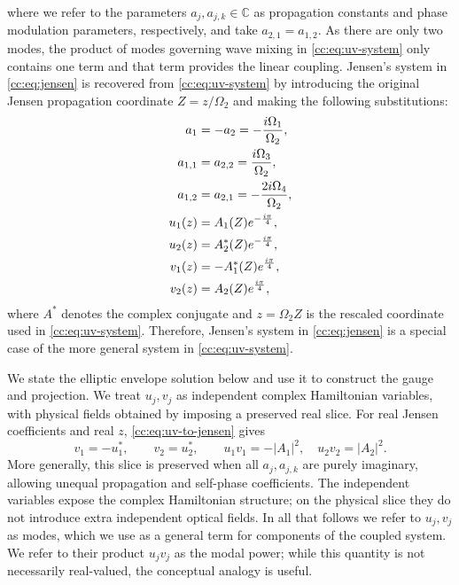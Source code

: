 \documentclass[11pt,a4paper]{article}
\numberwithin{equation}{section}
\begin{document}
where we refer to the parameters $a_j, a_{j,k} \in \mathbb{C}$ as propagation constants and phase modulation parameters, respectively, and take $a_{2,1} = a_{1,2}$.
As there are only two modes, the product of modes governing wave mixing in \eqref{cc:eq:uv-system} only contains one term and that term provides the linear coupling. 
Jensen's system in \eqref{cc:eq:jensen} is recovered from \eqref{cc:eq:uv-system} by introducing the original Jensen propagation coordinate $Z=z/\Omega_2$ and making the following substitutions:
\begin{align}
a_1 &= - a_2 = - \frac{i {\Omega}_{1}}{{\Omega}_{2}}, \notag \\
a_{1,1} &= a_{2,2} = \frac{i {\Omega}_{3}}{{\Omega}_{2}}, \notag \\
a_{1,2} &= a_{2,1} = - \frac{2 i {\Omega}_{4}}{{\Omega}_{2}}, \notag \\
u_1(z) &= A_1{\left(Z\right)} e^{- \frac{i \pi}{4}}, \notag \\
u_2(z) &= A^{*}_2{\left(Z\right)} e^{- \frac{i \pi}{4}}, \notag \\
v_1(z) &= -A^{*}_1{\left(Z\right)} e^{\frac{i \pi}{4}}, \notag \\
v_2(z) &= A_2{\left(Z\right)} e^{\frac{i \pi}{4}}, \label{cc:eq:uv-to-jensen}
\end{align}
where $A^*$ denotes the complex conjugate and $z=\Omega_2 Z$ is the rescaled coordinate used in \eqref{cc:eq:uv-system}.
Therefore, Jensen's system in \eqref{cc:eq:jensen} is a special case of the more general system in \eqref{cc:eq:uv-system}.

We state the elliptic envelope solution below and use it to construct the gauge and projection.
We treat $u_j,v_j$ as independent complex Hamiltonian variables, with physical fields obtained by imposing a preserved real slice.
For real Jensen coefficients and real $z$, \eqref{cc:eq:uv-to-jensen} gives
\begin{equation}
v_1=-u_1^*,\qquad v_2=u_2^*,\qquad
u_1v_1=-|A_1|^2,\quad u_2v_2=|A_2|^2.
\label{cc:eq:physical-slice}
\end{equation}
More generally, this slice is preserved when all $a_j,a_{j,k}$ are purely imaginary, allowing unequal propagation and self-phase coefficients.
The independent variables expose the complex Hamiltonian structure; on the physical slice they do not introduce extra independent optical fields.
In all that follows we refer to $u_j, v_j$ as modes, which we use as a general term for components of the coupled system. 
We refer to their product $u_j v_j$ as the modal power; while this quantity is not necessarily real-valued, the conceptual analogy is useful.
\end{document}
